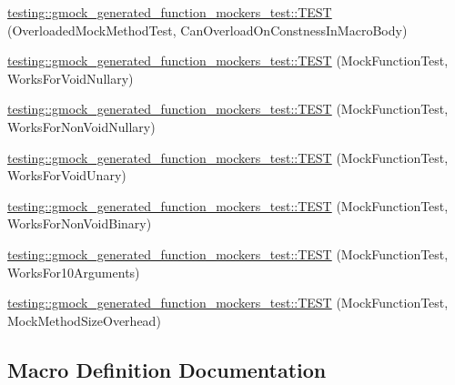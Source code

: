 \begin{DoxyCompactItemize}
\mbox{\hyperlink{namespacetesting_1_1gmock__generated__function__mockers__test_aa58ec93a77bee21244c10da2bc8cf70e}{testing\+::gmock\+\_\+generated\+\_\+function\+\_\+mockers\+\_\+test\+::\+T\+E\+ST}} (Overloaded\+Mock\+Method\+Test, Can\+Overload\+On\+Constness\+In\+Macro\+Body)
\item 
\mbox{\hyperlink{namespacetesting_1_1gmock__generated__function__mockers__test_a8d67aadbc04fee7e2afc10ee91a76b74}{testing\+::gmock\+\_\+generated\+\_\+function\+\_\+mockers\+\_\+test\+::\+T\+E\+ST}} (Mock\+Function\+Test, Works\+For\+Void\+Nullary)
\item 
\mbox{\hyperlink{namespacetesting_1_1gmock__generated__function__mockers__test_a90817999d7f25ecf280453efb157db84}{testing\+::gmock\+\_\+generated\+\_\+function\+\_\+mockers\+\_\+test\+::\+T\+E\+ST}} (Mock\+Function\+Test, Works\+For\+Non\+Void\+Nullary)
\item 
\mbox{\hyperlink{namespacetesting_1_1gmock__generated__function__mockers__test_ab0e1ede6a1f6ef1774e27f5793a33599}{testing\+::gmock\+\_\+generated\+\_\+function\+\_\+mockers\+\_\+test\+::\+T\+E\+ST}} (Mock\+Function\+Test, Works\+For\+Void\+Unary)
\item 
\mbox{\hyperlink{namespacetesting_1_1gmock__generated__function__mockers__test_ab6337da98bc6bc97100ab177386f3b2b}{testing\+::gmock\+\_\+generated\+\_\+function\+\_\+mockers\+\_\+test\+::\+T\+E\+ST}} (Mock\+Function\+Test, Works\+For\+Non\+Void\+Binary)
\item 
\mbox{\hyperlink{namespacetesting_1_1gmock__generated__function__mockers__test_aa92f0b2b98d76f2c881103a19bed7ba6}{testing\+::gmock\+\_\+generated\+\_\+function\+\_\+mockers\+\_\+test\+::\+T\+E\+ST}} (Mock\+Function\+Test, Works\+For10\+Arguments)
\item 
\mbox{\hyperlink{namespacetesting_1_1gmock__generated__function__mockers__test_af89476eb6775c51ca67e398d06c35d43}{testing\+::gmock\+\_\+generated\+\_\+function\+\_\+mockers\+\_\+test\+::\+T\+E\+ST}} (Mock\+Function\+Test, Mock\+Method\+Size\+Overhead)
\end{DoxyCompactItemize}


\subsection{Macro Definition Documentation}
\mbox{\label{_obj__test_2lib_2googletest-release-1_88_81_2googlemock_2test_2gmock-generated-function-mockers__test_8cc_af5ea000ce48c75251a5542898a872339}} 
